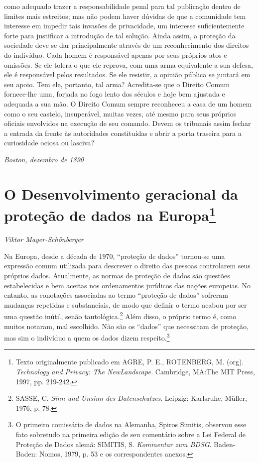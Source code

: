 como adequado trazer a responsabilidade penal para tal publicação dentro
de limites mais estreitos; mas não podem haver dúvidas de que a
comunidade tem interesse em impedir tais invasões de privacidade, um
interesse suficientemente forte para justificar a introdução de tal
solução. Ainda assim, a proteção da sociedade deve se dar principalmente
através de um reconhecimento dos direitos do indivíduo. Cada homem é
responsável apenas por seus próprios atos e omissões. Se ele tolera o
que ele reprova, com uma arma equivalente a sua defesa, ele é
responsável pelos resultados. Se ele resistir, a opinião pública se
juntará em seu apoio. Tem ele, portanto, tal arma? Acredita-se que o
Direito Comum fornece-lhe uma, forjada no fogo lento dos séculos e hoje
bem ajustada e adequada a sua mão. O Direito Comum sempre reconheceu a
casa de um homem como o seu castelo, insuperável, muitas vezes, até
mesmo para seus próprios oficiais envolvidos na execução de seu comando.
Devem os tribunais assim fechar a entrada da frente às autoridades
constituídas e abrir a porta traseira para a curiosidade ociosa ou
lasciva?

\medskip
\begin{flushright}
\emph{Boston, dezembro de 1890}
\end{flushright}

\chapter{O Desenvolvimento geracional da proteção de dados na
Europa\footnote{Texto originalmente publicado em
  AGRE, P. E., ROTENBERG, M. (org). \emph{Technology and Privacy: The
  NewLandscape.} Cambridge, MA:The MIT Press, 1997, pp. 219-242.}}\label{o-desenvolvimento-geracional-da-proteuxe7uxe3o-de-dados-na-europa}

\begin{flushright}
\emph{Viktor Mayer-Schönberger}
\end{flushright}

Na Europa, desde a década de 1970, ``proteção de dados'' tornou-se uma
expressão comum utilizada para descrever o direito das pessoas
controlarem seus próprios dados. Atualmente, as normas de proteção de
dados são questões estabelecidas e bem aceitas nos ordenamentos
jurídicos das nações europeias. No entanto, as conotações associadas ao
termo ``proteção de dados'' sofreram mudanças repetidas e substanciais,
de modo que definir o termo acabou por ser uma questão inútil, senão
tautológica.\footnote{SASSE, C. \emph{Sinn und Unsinn des
  Datenschutzes}. Leipzig: Karlsruhe, Müller, 1976, p. 78.} Além disso,
o próprio termo é, como muitos notaram, mal escolhido. Não são os
``dados'' que necessitam de proteção, mas sim o indivíduo a quem os
dados dizem respeito.\footnote{O primeiro comissário de dados na
  Alemanha, Spiros Simitis, observou esse fato sobretudo na primeira
  edição de seu comentário sobre a Lei Federal de Proteção de Dados
  alemã: SIMITIS, S. \emph{Kommentar zum BDSG}. Baden-Baden: Nomos,
  1979, p. 53 e os correspondentes anexos.}

